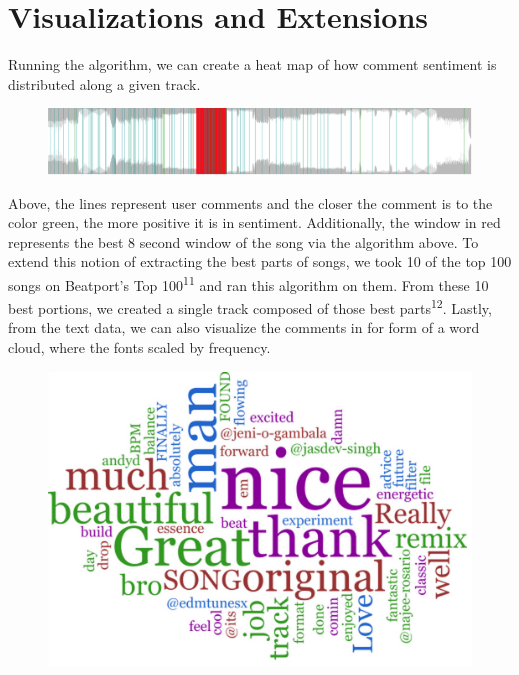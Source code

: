 \documentclass[12pt]{dalcsthesis}
\begin{document}
\section{Visualizations and Extensions}

Running the algorithm, we can create a heat map of how comment sentiment is distributed along a given track. 

\begin{figure}[h]
\includegraphics[scale=.45]{best_window}
\centering
\end{figure}

Above, the lines represent user comments and the closer the comment is to the color green, the more positive it is in sentiment. Additionally, the window in red represents the best 8 second window of the song via the algorithm above. To extend this notion of extracting the best parts of songs, we took 10 of the top 100 songs on Beatport's Top 100\textsuperscript{11} and ran this algorithm on them. From these 10 best portions, we created a single track composed of those best parts\textsuperscript{12}. Lastly, from the text data, we can also visualize the comments in for form of a word cloud, where the fonts scaled by frequency.

\begin{figure}[h]
\includegraphics[scale=.45]{word_cloud}
\centering
\end{figure}
\end{document}
